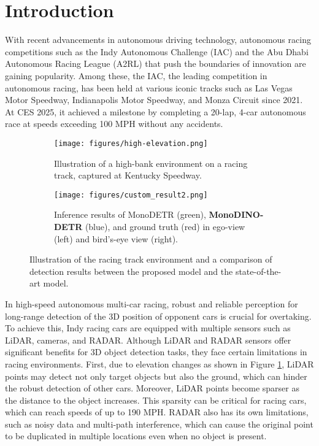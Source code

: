 \section{Introduction}
\label{sec:introduction}
With recent advancements in autonomous driving technology, autonomous racing competitions such as the Indy Autonomous Challenge (IAC) and the Abu Dhabi Autonomous Racing League (A2RL) that push the boundaries of innovation are gaining popularity. Among these, the IAC, the leading competition in autonomous racing, has been held at various iconic tracks such as Las Vegas Motor Speedway, Indianapolis Motor Speedway, and Monza Circuit since 2021. At CES 2025, it achieved a milestone by completing a 20-lap, 4-car autonomous race at speeds exceeding 100 MPH without any accidents.
\begin{figure}[t]
    \centering
    \begin{subfigure}{0.45\textwidth}
        \centering
        \texttt{[image: figures/high-elevation.png]}
        \caption{Illustration of a high-bank environment on a racing track, captured at Kentucky Speedway.}
        \label{fig:high-elevation}
    \end{subfigure}
    \begin{subfigure}{0.45\textwidth}
        \centering
        \texttt{[image: figures/custom\_result2.png]}
        \caption{Inference results of MonoDETR (green), \textbf{MonoDINO-DETR} (blue), and ground truth (red) in ego-view (left) and bird's-eye view (right).}
        \label{fig:custom_result}
    \end{subfigure}
    \caption{Illustration of the racing track environment and a comparison of detection results between the proposed model and the state-of-the-art model.}
    \label{fig:main_monodinodetr}
\end{figure}

In high-speed autonomous multi-car racing, robust and reliable perception for long-range detection of the 3D position of opponent cars is crucial for overtaking. To achieve this, Indy racing cars are equipped with multiple sensors such as LiDAR, cameras, and RADAR. Although LiDAR and RADAR sensors offer significant benefits for 3D object detection tasks, they face certain limitations in racing environments. First, due to elevation changes as shown in Figure \ref{fig:high-elevation}, LiDAR points may detect not only target objects but also the ground, which can hinder the robust detection of other cars. Moreover, LiDAR points become sparser as the distance to the object increases. This sparsity can be critical for racing cars, which can reach speeds of up to 190 MPH. RADAR also has its own limitations, such as noisy data and multi-path interference, which can cause the original point to be duplicated in multiple locations even when no object is present.

